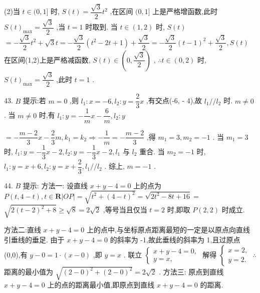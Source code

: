 (2)当 $t \in  (0,1\rbrack$ 时, $S\left( t\right)  = \dfrac{\sqrt{3}}{2}{t}^{2}$ ,在区间 $(0,1\rbrack$ 上是严格增函数,此时 $S{\left( t\right) }_{\max } = \dfrac{\sqrt{3}}{2}$ ,当 $t = 1$ 时取到. 当 $t \in  \left( {1,2}\right)$ 时, $S\left( t\right)$  $=  - \dfrac{\sqrt{3}}{2}{t}^{2} + \sqrt{3}t =  - \dfrac{\sqrt{3}}{2}\left( {{t}^{2} - {2t} + 1}\right)  + \dfrac{\sqrt{3}}{2} =  - \dfrac{\sqrt{3}}{2}{\left( t - 1\right) }^{2} + \dfrac{\sqrt{3}}{2},S\left( t\right)$ 在区间(1,2)上是严格减函数, $S\left( t\right)  \in  \left( {0,\dfrac{\sqrt{3}}{2}}\right)$ , $\therefore t \in  \left( {0,2}\right)$ 时, $S{\left( t\right) }_{\max } = \dfrac{\sqrt{3}}{2}$ ,此时 $t = 1$ .

43. $B$ 提示:若 $m = 0$ ,则 ${l}_{1} : x =  - 6,{l}_{2} : y = \dfrac{2}{3}x$ ,有交点(-6, - 4),故 ${l}_{1}//{l}_{2}$ 时. $m \neq  0$ . 当 $m \neq  0$ 时,有 ${l}_{1} : y =  - \dfrac{1}{m}x - \dfrac{6}{m},{l}_{2} : y$

$=  - \dfrac{m - 2}{3}x - \dfrac{2}{3}m,{k}_{1} = {k}_{2} \Rightarrow   - \dfrac{1}{m} =  - \dfrac{m - 2}{3}$ ,得 ${m}_{1} = 3,{m}_{2} =  - 1$ . 当 ${m}_{1} = 3$ 时, ${l}_{1} : y =  - \dfrac{1}{3}x - 2,{l}_{2} : y =  - \dfrac{1}{3}x - 2,{l}_{1}$ 与 ${l}_{2}$ 重合. 当 ${m}_{2} =  - 1$ 时, ${l}_{1} : y = x + 6,{l}_{2} : y = x + \dfrac{2}{3},{l}_{1}//{l}_{2}$ . 综上, $m =  - 1$ .

44. $B$ 提示: 方法一: 设直线 $x + y - 4 = 0$ 上的点为 $P\left( {t,4 - t}\right) ,t \in  \mathbf{R}\left| {OP}\right|  = \sqrt{{t}^{2} + {\left( 4 - t\right) }^{2}} = \sqrt{2{t}^{2} - {8t} + {16}} =$  $\sqrt{2{\left( t - 2\right) }^{2} + 8} \geq  \sqrt{8} = 2\sqrt{2}$ ,等号当且仅当 $t = 2$ 时,即取 $P\left( {2,2}\right)$ 时成立.

方法二:直线 $x + y - 4 = 0$ 上的点中,与坐标原点距离最短的一定是以原点向直线引垂线的垂足. 由于 $x + y - 4 = 0$ 的斜率为 -1,故此垂线的斜率为 1,且过原点(0,0),有 $y - 0 = 1 \cdot  \left( {x - 0}\right)$ ,即 $y = x$ . 联立 $\left\{  \begin{array}{l} x + y - 4 = 0, \\  y = x, \end{array}\right.$ 解得 $\left\{  {\begin{array}{l} x = 2, \\  y = 2. \end{array}\;\therefore }\right.$ 距离的最小值为 $\sqrt{{\left( 2 - 0\right) }^{2} + {\left( 2 - 0\right) }^{2}} = 2\sqrt{2}$ . 方法三: 原点到直线 $x + y - 4 = 0$ 上的点的距离最小值,即原点到直线 $x + y - 4 = 0$ 的距离.

